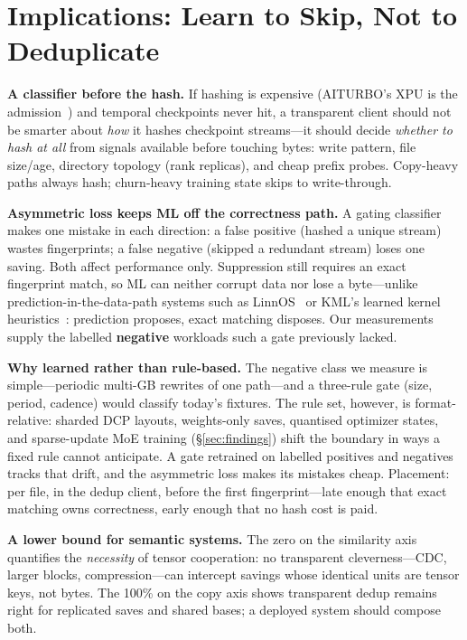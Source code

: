 \documentclass[sigconf,10pt,anonymous,review]{acmart}
\begin{document}
\section{Implications: Learn to Skip, Not to Deduplicate}
\label{sec:implications}

\textbf{A classifier before the hash.} If hashing is expensive
(AITURBO's XPU is the admission~\cite{aiturbo}) and temporal checkpoints
never hit, a transparent client should not be smarter about \emph{how} it
hashes checkpoint streams---it should decide \emph{whether to hash at
all} from signals available before touching bytes: write pattern, file
size/age, directory topology (rank replicas), and cheap prefix probes.
Copy-heavy paths always hash; churn-heavy training state skips to
write-through.

\textbf{Asymmetric loss keeps ML off the correctness path.} A gating
classifier makes one mistake in each direction: a false positive (hashed
a unique stream) wastes fingerprints; a false negative (skipped a
redundant stream) loses one saving. Both affect performance only.
Suppression still requires an exact fingerprint match, so ML can neither
corrupt data nor lose a byte---unlike prediction-in-the-data-path
systems such as LinnOS~\cite{linnos} or KML's learned kernel
heuristics~\cite{kml}: prediction proposes, exact matching disposes. Our
measurements supply the labelled \textbf{negative} workloads such a gate
previously lacked.

\textbf{Why learned rather than rule-based.} The negative class we
measure is simple---periodic multi-GB rewrites of one path---and a
three-rule gate (size, period, cadence) would classify today's fixtures.
The rule set, however, is format-relative: sharded DCP layouts,
weights-only saves, quantised optimizer states, and sparse-update MoE
training (\S\ref{sec:findings}) shift the boundary in ways a fixed rule
cannot anticipate. A gate retrained on labelled positives and negatives
tracks that drift, and the asymmetric loss makes its mistakes cheap.
Placement: per file, in the dedup client, before the first
fingerprint---late enough that exact matching owns correctness, early
enough that no hash cost is paid.

\textbf{A lower bound for semantic systems.} The zero
on the similarity axis quantifies the \emph{necessity} of tensor
cooperation: no transparent cleverness---CDC, larger blocks,
compression---can intercept savings whose identical units are tensor
keys, not bytes. The 100\% on the copy axis shows transparent dedup
remains right for replicated saves and shared bases; a deployed system
should compose both.
\end{document}
